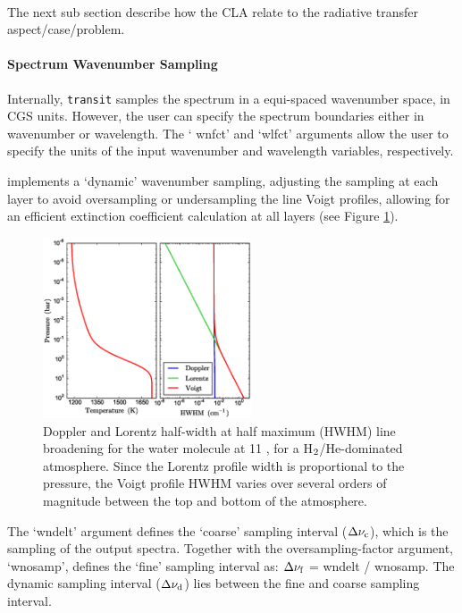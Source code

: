 \documentclass[letterpaper, 12pt]{article}
\begin{document}
 \\
The next sub section describe how the CLA relate to the radiative
transfer aspect/case/problem.

\paragraph{Spectrum Wavenumber Sampling}

Internally, {\tt transit} samples the spectrum in a equi-spaced
wavenumber space, in CGS units.  However, the user can specify the
spectrum boundaries either in wavenumber or wavelength.  The `{\tttb
  wnfct}' and `{\tttb wlfct}' arguments allow the user to specify the
units of the input wavenumber and wavelength variables, respectively.

{\transit} implements a `dynamic' wavenumber sampling, adjusting the
sampling at each layer to avoid oversampling or undersampling the line
Voigt profiles, allowing for an efficient extinction coefficient
calculation at all layers (see Figure \ref{fig:broadening}).

\begin{figure}[htb]
\centerline{
\includegraphics[width=0.55\textwidth, clip]{figs/widths.ps}}
\caption{\small \label{fig:broadening} Doppler and Lorentz half-width
  at half maximum (HWHM) line broadening for the water molecule at 11
  {\microns}, for a H$\sb{2}$/He-dominated atmosphere.  Since the
  Lorentz profile width is proportional to the pressure, the Voigt
  profile HWHM varies over several orders of magnitude between the top
  and bottom of the atmosphere.}
\end{figure}

The `{\tttb wndelt}' argument defines the `coarse' sampling interval
($\Delta\nu\sb{\rm c}$), which is the sampling of the output spectra.
Together with the oversampling-factor argument, `{\tttb wnosamp}',
{\transit} defines the `fine' sampling interval as: $\Delta\nu\sb{\rm
  f}$ = {\tttb wndelt / wnosamp}.  The dynamic sampling interval
($\Delta\nu\sb{\rm d}$) lies between the fine and coarse sampling
interval.
\end{document}
